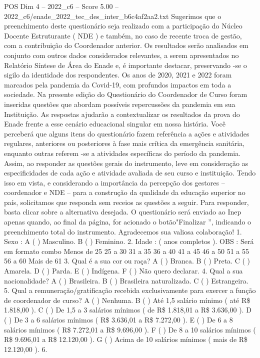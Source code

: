 \begin{textsample}{POS Dim 4 – 2022\_c6 – Score 5.00 – 2022\_c6/enade\_2022\_tec\_des\_inter\_b6c4af2aa2.txt}
Sugerimos que o preenchimento deste questionário seja realizado com a participação do Núcleo Docente Estruturante ( NDE ) e também, no caso de recente troca de gestão, com a contribuição do Coordenador anterior.
Os resultados serão analisados em conjunto com outros dados considerados relevantes, a serem apresentados no Relatório Síntese de Área do Enade e, é importante destacar, preservando -se o sigilo da identidade dos respondentes.
Os anos de 2020, 2021 e 2022 foram marcados pela pandemia da Covid-19, com profundos impactos em toda a sociedade.
Na presente edição do Questionário do Coordenador de Curso foram inseridas questões que abordam possíveis repercussões da pandemia em sua Instituição.
As respostas ajudarão a contextualizar os resultados da prova do Enade frente a esse cenário educacional singular em nossa história.
Você perceberá que alguns itens do questionário fazem referência a ações e atividades regulares, anteriores ou posteriores à fase mais crítica da emergência sanitária, enquanto outras referem -se a atividades específicas do período da pandemia.
Assim, ao responder as questões gerais do instrumento, leve em consideração as especificidades de cada ação e atividade avaliada de seu curso e instituição.
Tendo isso em vista, e considerando a importância da percepção dos gestores – coordenador e NDE – para a construção da qualidade da educação superior no país, solicitamos que responda sem receios as questões a seguir.
Para responder, basta clicar sobre a alternativa desejada.
O questionário será enviado ao Inep apenas quando, ao final da página, for acionado o botão"Finalizar ”, indicando o preenchimento total do instrumento.
Agradecemos sua valiosa colaboração! 1.
Sexo : A ( ) Masculino.
B ( ) Feminino. 2.
Idade : ( anos completos ).
OBS : Será em formato combo Menos de 25 25 a 30 31 a 35 36 a 40 41 a 45 46 a 50 51 a 55 56 a 60 Mais de 61 3.
Qual é a sua cor ou raça?
A ( ) Branca.
B ( ) Preta.
C ( ) Amarela.
D ( ) Parda.
E ( ) Indígena.
F ( ) Não quero declarar. 4.
Qual a sua nacionalidade?
A ( ) Brasileira.
B ( ) Brasileira naturalizada.
C ( ) Estrangeira. 5.
Qual a remuneração/gratificação recebida exclusivamente para exercer a função de coordenador de curso?
A ( ) Nenhuma.
B ( ) Até 1,5 salário mínimo ( até R\$ 1.818,00 ).
C ( ) De 1,5 a 3 salários mínimos ( de R\$ 1.818,01 a R\$ 3.636,00 ).
D ( ) De 3 a 6 salários mínimos ( R\$ 3.636,01 a R\$ 7.272,00 ).
E ( ) De 6 a 8 salários mínimos ( R\$ 7.272,01 a R\$ 9.696,00 ).
F ( ) De 8 a 10 salários mínimos ( R\$ 9.696,01 a R\$ 12.120,00 ).
G ( ) Acima de 10 salários mínimos ( mais de R\$ 12.120,00 ). 6.

\end{textsample}
